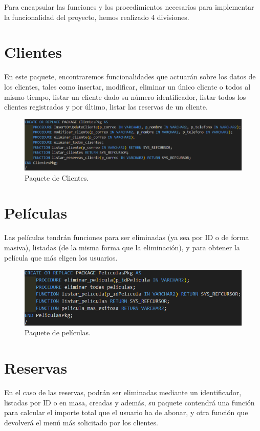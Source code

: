 Para encapsular las funciones y los procedimientos necesarios para implementar la funcionalidad del proyecto, hemos realizado 4 divisiones.


\section{Clientes}
En este paquete, encontraremos funcionalidades que actuarán sobre los datos de los clientes, tales como insertar, modificar, eliminar un único cliente o todos al mismo tiempo, listar un cliente dado su número identificador, listar todos los clientes registrados y por último, listar las reservas de un cliente.

\begin{figure}[ht]
    \centering
    \includegraphics[width=0.7\linewidth]{documentation//apartados//paquetes/paquete-clientes.png}
    \caption{Paquete de Clientes.}
\end{figure}

\section{Películas}
Las películas tendrán funciones para ser eliminadas (ya sea por ID o de forma masiva), listadas (de la misma forma que la eliminación), y para obtener la película que más eligen los usuarios.

\begin{figure}[ht]
    \centering
    \includegraphics[width=0.7\linewidth]{documentation//apartados//paquetes/paquete-peliculas.png}
    \caption{Paquete de películas.}
\end{figure}

\section{Reservas}
En el caso de las reservas, podrán ser eliminadas mediante un identificador, listadas por ID o en masa, creadas y además, su paquete contendrá una función para calcular el importe total que el usuario ha de abonar, y otra función que devolverá el menú más solicitado por los clientes.


